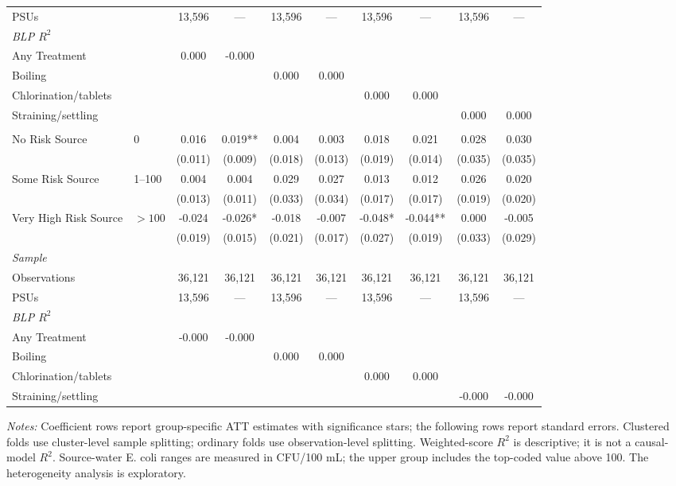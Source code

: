 \begin{landscape}
\begin{table}[p]
\begin{adjustbox}{max width=\linewidth, center}
\begin{tabular}{llcccccccc}
\quad PSUs &  & 13,596 & --- & 13,596 & --- & 13,596 & --- & 13,596 & --- \\
\multicolumn{10}{l}{\textit{BLP $R^{2}$}} \\
\quad Any Treatment &  & 0.000 & -0.000 &  &  &  &  &  &  \\
\quad Boiling &  &  &  & 0.000 & 0.000 &  &  &  &  \\
\quad Chlorination/tablets &  &  &  &  &  & 0.000 & 0.000 &  &  \\
\quad Straining/settling &  &  &  &  &  &  &  & 0.000 & 0.000 \\
\addlinespace[4pt]
\multicolumn{10}{l}{Diarrhea (under-5): Initial source-water E. coli risk} \\
No Risk Source & 0 & 0.016 & 0.019** & 0.004 & 0.003 & 0.018 & 0.021 & 0.028 & 0.030 \\
 &  & (0.011) & (0.009) & (0.018) & (0.013) & (0.019) & (0.014) & (0.035) & (0.035) \\
Some Risk Source & 1--100 & 0.004 & 0.004 & 0.029 & 0.027 & 0.013 & 0.012 & 0.026 & 0.020 \\
 &  & (0.013) & (0.011) & (0.033) & (0.034) & (0.017) & (0.017) & (0.019) & (0.020) \\
Very High Risk Source & $>100$ & -0.024 & -0.026* & -0.018 & -0.007 & -0.048* & -0.044** & 0.000 & -0.005 \\
 &  & (0.019) & (0.015) & (0.021) & (0.017) & (0.027) & (0.019) & (0.033) & (0.029) \\
\multicolumn{10}{l}{\textit{Sample}} \\
\quad Observations &  & 36,121 & 36,121 & 36,121 & 36,121 & 36,121 & 36,121 & 36,121 & 36,121 \\
\quad PSUs &  & 13,596 & --- & 13,596 & --- & 13,596 & --- & 13,596 & --- \\
\multicolumn{10}{l}{\textit{BLP $R^{2}$}} \\
\quad Any Treatment &  & -0.000 & -0.000 &  &  &  &  &  &  \\
\quad Boiling &  &  &  & 0.000 & 0.000 &  &  &  &  \\
\quad Chlorination/tablets &  &  &  &  &  & 0.000 & 0.000 &  &  \\
\quad Straining/settling &  &  &  &  &  &  &  & -0.000 & -0.000 \\
\bottomrule
\end{tabular}
\end{adjustbox}
\par\vspace{3pt}
\begin{minipage}{\linewidth}\footnotesize \textit{Notes:} Coefficient rows report group-specific ATT estimates with significance stars; the following rows report standard errors. Clustered folds use cluster-level sample splitting; ordinary folds use observation-level splitting. Weighted-score $R^2$ is descriptive; it is not a causal-model $R^2$. Source-water E. coli ranges are measured in CFU/100 mL; the upper group includes the top-coded value above 100. The heterogeneity analysis is exploratory.\end{minipage}
\end{table}
\end{landscape}